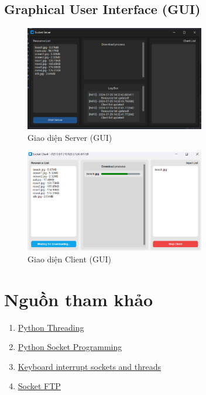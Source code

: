 \documentclass[a4paper,12pt]{report}
\begin{document}
\subsection{Graphical User Interface (GUI)}
\begin{figure}[ht]
  \centering
  \includegraphics[width=0.7\textwidth]{Screenshots/server-gui.png}
  \caption{Giao diện Server (GUI)}\label{fig:server-gui}
\end{figure}
\begin{figure}[ht]
  \centering
  \includegraphics[width=0.7\textwidth]{Screenshots/client-gui.png}
  \caption{Giao diện Client (GUI)}\label{fig:client-gui}
\end{figure}

\pagebreak
\section{Nguồn tham khảo}
\begin{enumerate}
  \item \href{https://realpython.com/intro-to-python-threading}{Python Threading}
  \item \href{https://realpython.com/python-sockets/#handling-multiple-connections}{Python Socket Programming}
  \item \href{https://stackoverflow.com/questions/47847392/keyboard-interrupt-sockets-and-threads}{Keyboard interrupt sockets and threads}
  \item \href{https://github.com/hadis98/FTP-Client-Server-Python-Socket-Programming}{Socket FTP}
\end{enumerate}
\end{document}
